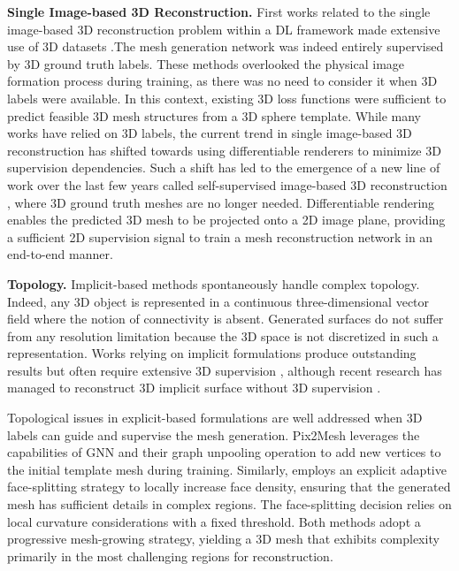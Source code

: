 \noindent\textbf{Single Image-based 3D Reconstruction.} First works related to the single image-based 3D reconstruction problem within a \ac{DL} framework \citep{choy20163d,girdhar2016learning,yang2018dense} made extensive use of 3D datasets \citep{chang2015shapenet,sun2018pix3d}.The mesh generation network was indeed entirely supervised by 3D ground truth labels. These methods overlooked the physical image formation process during training, as there was no need to consider it when 3D labels were available. In this context, existing 3D loss functions were sufficient to predict feasible 3D mesh structures from a 3D sphere template. While many works have relied on 3D labels, the current trend in single image-based 3D reconstruction has shifted towards using differentiable renderers to minimize 3D supervision dependencies. Such a shift has led to the emergence of a new line of work over the last few years called self-supervised image-based 3D reconstruction  \citep{kanazawa2018learning,li2020self,pavllo2020convolutional,henderson2020leveraging}, where 3D ground truth meshes are no longer needed. Differentiable rendering enables the predicted 3D mesh to be projected onto a 2D image plane, providing a sufficient 2D supervision signal to train a mesh reconstruction network in an end-to-end manner. 

\noindent\textbf{Topology.} Implicit-based methods spontaneously handle complex topology. Indeed, any 3D object is represented in a continuous three-dimensional vector field where the notion of connectivity is absent. Generated surfaces do not suffer from any resolution limitation because the 3D space is not discretized in such a representation. Works relying on implicit formulations produce outstanding results but often require extensive 3D supervision \citep{saito2020pifuhd}, although recent research has managed to reconstruct 3D implicit surface without 3D supervision \citep{niemeyer2020differentiable,liu2019learning}. 

Topological issues in explicit-based formulations are well addressed when 3D labels can guide and supervise the mesh generation. Pix2Mesh \citep{wang2018pixel2mesh} leverages the capabilities of \ac{GNN} and their graph unpooling operation to add new vertices to the initial template mesh during training. Similarly, \citep{smith2019geometrics} employs an explicit adaptive face-splitting strategy to locally increase face density, ensuring that the generated mesh has sufficient details in complex regions. The face-splitting decision relies on local curvature considerations with a fixed threshold. Both methods adopt a progressive mesh-growing strategy, yielding a 3D mesh that exhibits complexity primarily in the most challenging regions for reconstruction. 

